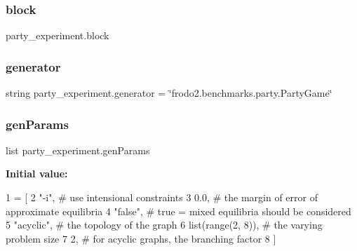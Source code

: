 \subsubsection{\texorpdfstring{block}{block}}
{\footnotesize\ttfamily party\+\_\+experiment.\+block}

\mbox{\label{namespaceparty__experiment_a6867f51172751a35b28e2ff4dff9d1f5}} 
\subsubsection{\texorpdfstring{generator}{generator}}
{\footnotesize\ttfamily string party\+\_\+experiment.\+generator = \char`\"{}frodo2.\+benchmarks.\+party.\+Party\+Game\char`\"{}}

\mbox{\label{namespaceparty__experiment_a7b133c29cf6a6f324b2f41853c9bf62d}} 
\subsubsection{\texorpdfstring{gen\+Params}{genParams}}
{\footnotesize\ttfamily list party\+\_\+experiment.\+gen\+Params}

{\bfseries Initial value\+:}
\begin{DoxyCode}
1 =  [
2             \textcolor{stringliteral}{"-i"},                \textcolor{comment}{# use intensional constraints}
3             0.0,                 \textcolor{comment}{# the margin of error of approximate equilibria}
4             \textcolor{stringliteral}{"false"},             \textcolor{comment}{# true = mixed equilibria should be considered}
5             \textcolor{stringliteral}{"acyclic"},           \textcolor{comment}{# the topology of the graph}
6             list(range(2, 8)),   \textcolor{comment}{# the varying problem size}
7             2,                   \textcolor{comment}{# for acyclic graphs, the branching factor}
8             ]
\end{DoxyCode}
\mbox{\label{namespaceparty__experiment_ab94a6102a8d9a5ba4fd35b155a06b727}} 
